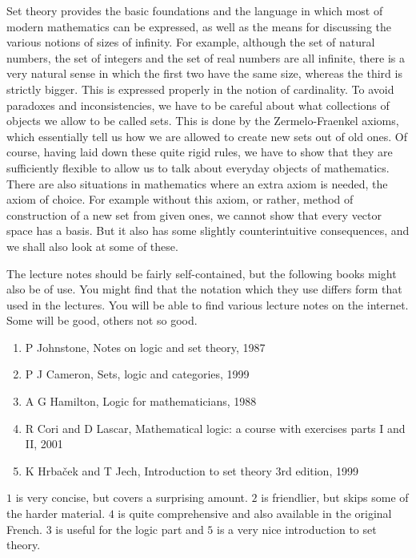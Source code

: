 \documentclass{article}
\theoremstyle{definition}\newtheorem{definition}{Definition}[subsection]
\theoremstyle{definition}\newtheorem{remark1}[definition]{Remark}
\theoremstyle{definition}\newtheorem{example1}[definition]{Example}
\theoremstyle{definition}\newtheorem*{remark2}{Remark}
\theoremstyle{definition}\newtheorem*{example2}{Example}
\theoremstyle{definition}\newtheorem*{note}{Note}
\theoremstyle{definition}\newtheorem*{notation}{Notation}
\begin{document}
Set theory provides the basic foundations and the language in which most of modern mathematics can be expressed, as well as the means for discussing the various notions of sizes of infinity. For example, although the set of natural numbers, the set of integers and the set of real numbers are all infinite, there is a very natural sense in which the first two have the same size, whereas the third is strictly bigger. This is expressed properly in the notion of cardinality. To avoid paradoxes and inconsistencies, we have to be careful about what collections of objects we allow to be called sets. This is done by the Zermelo-Fraenkel axioms, which essentially tell us how we are allowed to create new sets out of old ones. Of course, having laid down these quite rigid rules, we have to show that they are sufficiently flexible to allow us to talk about everyday objects of mathematics. There are also situations in mathematics where an extra axiom is needed, the axiom of choice. For example without this axiom, or rather, method of construction of a new set from given ones, we cannot show that every vector space has a basis. But it also has some slightly counterintuitive consequences, and we shall also look at some of these.

The lecture notes should be fairly self-contained, but the following books might also be of use. You might find that the notation which they use differs form that used in the lectures. You will be able to find various lecture notes on the internet. Some will be good, others not so good.

\begin{enumerate}
\item P Johnstone, Notes on logic and set theory, 1987
\item P J Cameron, Sets, logic and categories, 1999
\item A G Hamilton, Logic for mathematicians, 1988
\item R Cori and D Lascar, Mathematical logic: a course with exercises parts I and II, 2001
\item K Hrbaček and T Jech, Introduction to set theory 3rd edition, 1999
\end{enumerate}

$ 1 $ is very concise, but covers a surprising amount. $ 2 $ is friendlier, but skips some of the harder material. $ 4 $ is quite comprehensive and also available in the original French. $ 3 $ is useful for the logic part and $ 5 $ is a very nice introduction to set theory.

\pagebreak
\end{document}

